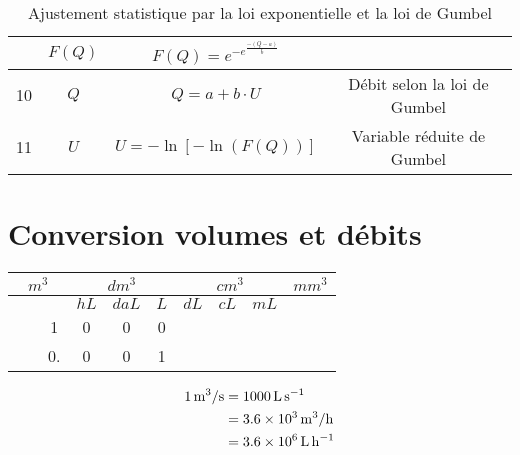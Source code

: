 \begin{table}[H]
\begin{tabular}{c|c|c|c}
        \hdashline                   
        9  & $F(Q)$                             & $F(Q) = e^{-e^{\frac{- \left(Q-a\right)}{b}}}$                                                                                            & \\
        \hline
        10  & $Q$                                & $Q = a + b \cdot U$                                                                                                                       & Débit selon la loi de Gumbel \\
        \hline
        11 & $U$                                & $U = -\ln \left[ -\ln \left(F(Q)\right)\right]$                                                                                          & Variable réduite de Gumbel   \\
    \end{tabular}
    \caption{Ajustement statistique par la loi exponentielle et la loi de Gumbel}
    \label{tab:loiGumbelAjuste}
\end{table}

\section{Conversion volumes et débits}
\begin{table}[h!]
    \centering
    \begin{tabular}{|c|c|c|c|c|c|c|c|c|c|c|c|}
        \hline
        \multicolumn{3}{|c|}{\textbf{$m^3$}} & \multicolumn{3}{|c|}{\textbf{$dm^3$}} & \multicolumn{3}{|c|}{\textbf{$cm^3$}} & \multicolumn{3}{|c|}{\textbf{$mm^3$}} \\
        \hline
         & &                                 & $hL$ & $daL$ & $L$                    & $dL$ & $cL$ & $mL$                    & & & \\
        \hline \hline
         & &                               1 & 0    &   0   & 0                      & & &                                   & & & \\  
        \hline
         & &                               0. & 0    &   0   & 1                     & & &                                   & & & \\
        \hline
    \end{tabular}
\end{table}

\begin{align*}
    \qty{1}{\metre^3 \per\second} &= \qty{1000}{\litre\per\second}   \\
           &= \qty{3.6e3}{\metre^3 \per\hour} \\
           &= \qty{3.6e6}{\litre\per\hour} \\
\end{align*}
